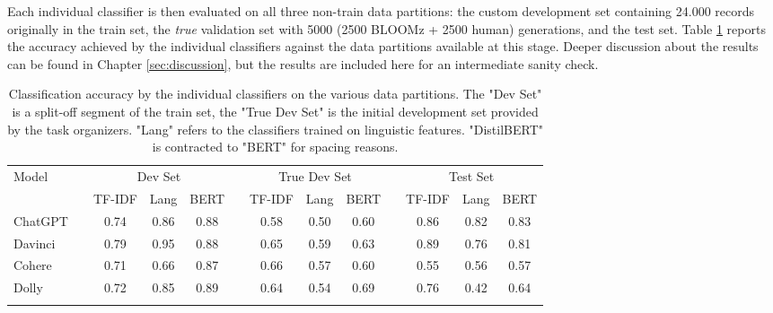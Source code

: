 Each individual classifier is then evaluated on all three non-train data partitions: the custom development set containing 24.000 records originally in the train set, the \emph{true} validation set with 5000 (2500 BLOOMz + 2500 human) generations, and the test set.
Table \ref{tab:subsolutions-initial} reports the accuracy achieved by the individual classifiers against the data partitions available at this stage.
Deeper discussion about the results can be found in Chapter \ref{sec:discussion}, but the results are included here for an intermediate sanity check.

\begin{table}[ht]
    \centering
    \vspace{0.1cm}
    \begin{tabular}{lp{5px}cccp{5px}cccp{5px}ccc}
        \toprule
        \multirow{2}{*}{Model} &  & \multicolumn{3}{c}{Dev Set} &             & \multicolumn{3}{c}{True Dev Set} &  & \multicolumn{3}{c}{Test Set}                                                                            \\
                               &  & \tiny{TF-IDF}               & \tiny{Lang} & \tiny{BERT}                      &  & \tiny{TF-IDF}                & \tiny{Lang} & \tiny{BERT} &  & \tiny{TF-IDF} & \tiny{Lang} & \tiny{BERT} \\
        \midrule
        ChatGPT                &  & 0.74                        & 0.86        & 0.88                             &  & 0.58                         & 0.50        & 0.60        &  & 0.86          & 0.82        & 0.83        \\
        Davinci                &  & 0.79                        & 0.95        & 0.88                             &  & 0.65                         & 0.59        & 0.63        &  & 0.89          & 0.76        & 0.81        \\
        Cohere                 &  & 0.71                        & 0.66        & 0.87                             &  & 0.66                         & 0.57        & 0.60        &  & 0.55          & 0.56        & 0.57        \\
        Dolly                  &  & 0.72                        & 0.85        & 0.89                             &  & 0.64                         & 0.54        & 0.69        &  & 0.76          & 0.42        & 0.64        \\
        \bottomrule
        \vspace{0.1cm}
    \end{tabular}
    \caption{
        Classification accuracy by the individual classifiers on the various data partitions.
        The "Dev Set" is a split-off segment of the train set, the "True Dev Set" is the initial development set provided by the task organizers.
        "Lang" refers to the classifiers trained on linguistic features.
        "DistilBERT" is contracted to "BERT" for spacing reasons.
    }
    \label{tab:subsolutions-initial}
\end{table}


